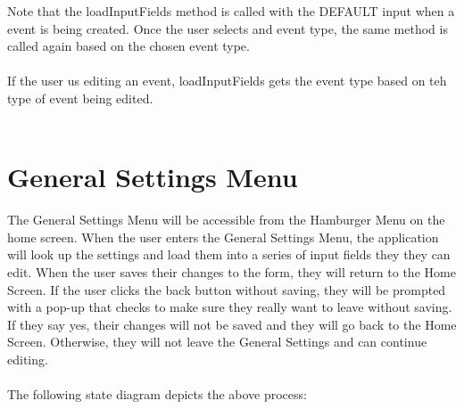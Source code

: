 \documentclass{scrreprt}
\begin{document}
Note that the loadInputFields method is called with the DEFAULT input when a event is being created. Once the user selects and event type, the same method is called again based on the chosen event type.\\\\
If the user us editing an event, loadInputFields gets the event type based on teh type of event being edited.\\\\

\section{General Settings Menu}

The General Settings Menu will be accessible from the Hamburger Menu on the home screen.  When the user enters the General Settings Menu, the application will look up the settings and load them into a series of input fields they they can edit.  When the user saves their changes to the form, they will return to the Home Screen.  If the user clicks the back button without saving, they will be prompted with a pop-up that checks to make sure they really want to leave without saving.  If they say yes, their changes will not be saved and they will go back to the Home Screen.  Otherwise, they will not leave the General Settings and can continue editing.
\\\\
The following state diagram depicts the above process:
\\\\
\end{document}
